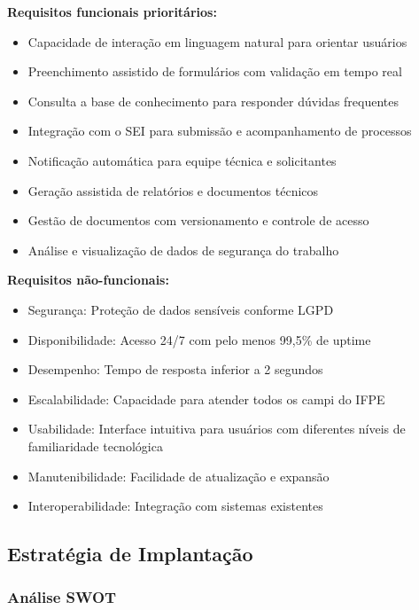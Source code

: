 \documentclass[12pt,a4paper]{article}
\begin{document}
\textbf{Requisitos funcionais prioritários:}

\begin{itemize}
    \item Capacidade de interação em linguagem natural para orientar usuários
    \item Preenchimento assistido de formulários com validação em tempo real
    \item Consulta a base de conhecimento para responder dúvidas frequentes
    \item Integração com o SEI para submissão e acompanhamento de processos
    \item Notificação automática para equipe técnica e solicitantes
    \item Geração assistida de relatórios e documentos técnicos
    \item Gestão de documentos com versionamento e controle de acesso
    \item Análise e visualização de dados de segurança do trabalho
\end{itemize}

\textbf{Requisitos não-funcionais:}

\begin{itemize}
    \item Segurança: Proteção de dados sensíveis conforme LGPD
    \item Disponibilidade: Acesso 24/7 com pelo menos 99,5\% de uptime
    \item Desempenho: Tempo de resposta inferior a 2 segundos
    \item Escalabilidade: Capacidade para atender todos os campi do IFPE
    \item Usabilidade: Interface intuitiva para usuários com diferentes níveis de familiaridade tecnológica
    \item Manutenibilidade: Facilidade de atualização e expansão
    \item Interoperabilidade: Integração com sistemas existentes
\end{itemize}

\subsection{Estratégia de Implantação}

\subsubsection{Análise SWOT}
\end{document}
